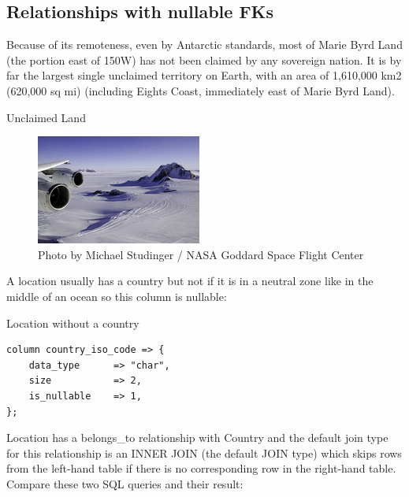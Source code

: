 \subsection{Relationships with nullable FKs}


Because of its remoteness, even by Antarctic standards, most of Marie Byrd
Land (the portion east of 150\degree{}W) has not been claimed by any sovereign
nation. It is by far the largest single unclaimed territory on Earth, with
an area of 1,610,000 km2 (620,000 sq mi) (including Eights Coast,
immediately east of Marie Byrd Land).

\begin{frame}{Unclaimed Land}
  \begin{figure}[!ht]
    \begin{center}
\includegraphics{img/Marie_Byrd_Land.jpg}
\caption[Marie Byrd Land]{Photo by Michael Studinger / NASA
  Goddard Space Flight Center}
    \end{center}
\end{figure}
\end{frame}

A location usually has a country but not if it is in a neutral zone like in
the middle of an ocean so this column is nullable:

\begin{frame}[fragile]{Location without a country}
\begin{lstlisting}
column country_iso_code => {
    data_type      => "char",
    size           => 2,
    is_nullable    => 1,
};
\end{lstlisting}
\end{frame}

Location has a belongs\_to relationship with Country and the default join
type for this relationship is an INNER JOIN (the default JOIN type) which
skips rows from the left-hand table if there is no corresponding row in the
right-hand table. Compare these two SQL queries and their result: 

